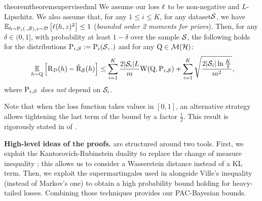 \begin{restatable}{theorem}{theoremsupervisednnl}
\label{theorem:supervised-nnl}
We assume our loss $\loss$ to be non-negative and $L$-Lipschitz. We also assume that, for any $1\leq i\leq K$, for any dataset$\S$, we have $\EE_{h\sim \P_{i}(.,\S), z\sim \D}\LB \loss(h,z)^2 \RB \leq 1$ (\emph{bounded order 2 moments for priors}).
Then, for any $\delta\in(0,1]$, with probability at least $1-\delta$ over the sample $\S$, the following holds for the distributions $\P_{i,\S}\defeq \P_i(\S,.)$ and for any $\Q\in\Mcal(\H)$: 
\begin{align*}
\ \EE_{h\sim\Q}\Big[ \Risk_{\D}(h) - \Riskhat_{\S}(h) \Big] \le \sum_{i=1}^{K} \frac{2|\S_i|L}{m} \W(\Q, \P_{i,\S}) + \sum_{i=1}^{K} \sqrt{\frac{2|\S_i|\ln\frac{K}{\delta}}{m^2}}, 
\end{align*}
where $\P_{i,\S}$ {\it does not} depend on $\S_i$.
\end{restatable}

Note that when the loss function takes values in $[0,1]$, an alternative strategy allows tightening the last term of the bound by a factor $\frac{1}{2}$.
This result is rigorously stated in  of . 

\textbf{High-level ideas of the proofs.}
 are structured around two tools.
First, we exploit the Kantorovich-Rubinstein duality \cite[Remark 6.5]{villani2009optimal} to replace the change of measure inequality \cite{csizar1975divergence,donsker1976asymp}; this allows us to consider a Wasserstein distance instead of a KL term.
Then, we exploit the supermartingales used in \cite{haddouche2023pac,chugg2023unified} alongside Ville's inequality (instead of Markov's one) to obtain a high probability bound holding for heavy-tailed losses.
Combining those techniques provides our PAC-Bayesian bounds.

